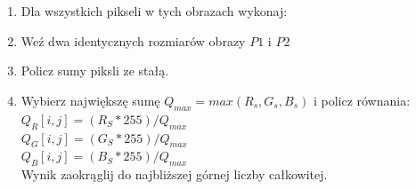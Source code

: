\documentclass[final,a4paper,openany,12pt]{mwbk}
\begin{document}
\hfill
\\\\
\indent

\begin{enumerate}	
		
		\item Dla wszystkich pikseli w tych obrazach wykonaj:
		\item Weź dwa identycznych rozmiarów obrazy $P1$ i $P2$
		\item Policz sumy piksli ze stałą.
		\item Wybierz największę sumę  $Q_{max} = max(R_{s}, G_{s}, B_{s})$ i policz równania:\\
		$Q_{R}[i,j] = (R_{S} * 255)/Q_{max}$\\
		$Q_{G}[i,j] = (G_{S} * 255)/Q_{max}$\\
		$Q_{B}[i,j] = (B_{S} * 255)/Q_{max}$\\
		Wynik zaokrąglij do najbliższej górnej liczby całkowitej.
	\end{enumerate}
\end{document}
